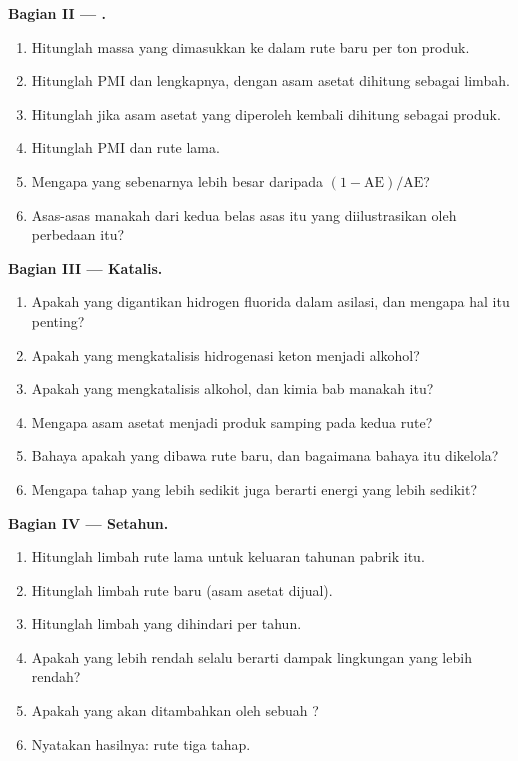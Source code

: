 \begin{problem}
\medskip\noindent\textbf{Bagian II --- .}
\begin{enumerate}[resume, beginpenalty=10000]
  \item Hitunglah massa yang dimasukkan ke dalam rute baru per ton produk.
  \item Hitunglah PMI dan  lengkapnya, dengan asam asetat dihitung sebagai limbah.
  \item Hitunglah  jika asam asetat yang diperoleh kembali dihitung sebagai produk.
  \item Hitunglah PMI dan  rute lama.
  \item Mengapa  yang sebenarnya lebih besar daripada $(1 - \mathrm{AE})/\mathrm{AE}$?
  \item Asas-asas manakah dari kedua belas asas itu yang diilustrasikan oleh perbedaan itu?
\end{enumerate}

\medskip\noindent\textbf{Bagian III --- Katalis.}
\begin{enumerate}[resume, beginpenalty=10000]
  \item Apakah yang digantikan hidrogen fluorida dalam asilasi, dan mengapa hal itu penting?
  \item Apakah yang mengkatalisis hidrogenasi keton menjadi alkohol?
  \item Apakah yang mengkatalisis  alkohol, dan kimia bab manakah itu?
  \item Mengapa asam asetat menjadi produk samping pada kedua rute?
  \item Bahaya apakah yang dibawa rute baru, dan bagaimana bahaya itu dikelola?
  \item Mengapa tahap yang lebih sedikit juga berarti energi yang lebih sedikit?
\end{enumerate}

\medskip\noindent\textbf{Bagian IV --- Setahun.}
\begin{enumerate}[resume, beginpenalty=10000]
  \item Hitunglah limbah rute lama untuk keluaran tahunan pabrik itu.
  \item Hitunglah limbah rute baru (asam asetat dijual).
  \item Hitunglah limbah yang dihindari per tahun.
  \item Apakah  yang lebih rendah selalu berarti dampak lingkungan yang lebih rendah?
  \item Apakah yang akan ditambahkan oleh sebuah ?
  \item Nyatakan hasilnya:  rute tiga tahap.
\end{enumerate}
\end{problem}
